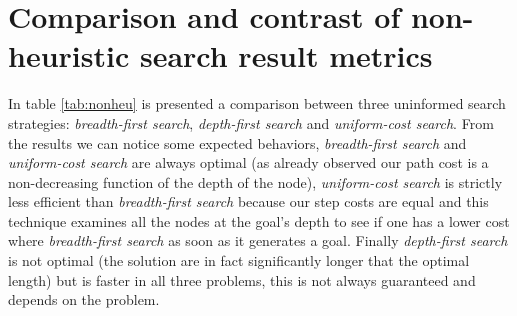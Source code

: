 \documentclass[10pt,a4paper]{article}
\begin{document}
\section{Comparison and contrast of non-heuristic search result metrics}

\begin{table}
\caption{Comparison and contrast of non-heuristic search result metrics.}\label{tab:nonheu}
\end{table}

In table \ref{tab:nonheu} is presented a comparison between three uninformed search strategies: \textit{breadth-first search}, \textit{depth-first search} and \textit{uniform-cost search}. From the results we can notice some expected behaviors, \textit{breadth-first search} and  \textit{uniform-cost search} are always optimal (as already observed our path cost is a non-decreasing function of the depth of the node), \textit{uniform-cost search} is strictly less efficient than \textit{breadth-first search} because our step costs are equal and this technique examines all the nodes at the goal's depth to see if one has a lower cost where \textit{breadth-first search} as soon as it generates a goal. Finally  \textit{depth-first search} is not optimal (the solution are in fact significantly longer that the optimal length) but is faster in all three problems, this is not always guaranteed and depends on the problem.
\end{document}

